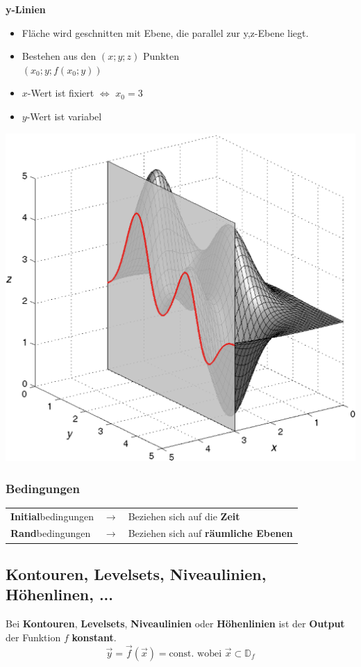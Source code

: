 \begin{minipage}[t]{0.48\columnwidth}
    \textbf{y-Linien}
    \begin{itemize}
        \item Fläche wird geschnitten mit Ebene, die parallel zur y,z-Ebene liegt.
        \item Bestehen aus den $(x;y;z)$ Punkten\\
        $(x_0;y;f(x_0;y))$
        \item $x$-Wert ist fixiert $\Leftrightarrow$ $x_0 = 3$
        \item $y$-Wert ist variabel
    \end{itemize}
    \includegraphics[width=\columnwidth]{images/schnitt_x0.png}
\end{minipage}

\subsubsection{Bedingungen}

\begin{tabular}{l l l}
    \textbf{Initial}bedingungen & $\rightarrow$ & Beziehen sich auf die \textbf{Zeit}\\
    \textbf{Rand}bedingungen & $\rightarrow$ & Beziehen sich auf \textbf{räumliche Ebenen}
\end{tabular}

\subsection{Kontouren, Levelsets, Niveaulinien, Höhenlinen, ...}
Bei \textbf{Kontouren}, \textbf{Levelsets}, \textbf{Niveaulinien} oder \textbf{Höhenlinien}
ist der \textbf{Output} der Funktion ${f}$ \textbf{konstant}.
$$\vec{y} = \vec{f}(\vec{x}) = \text{const. wobei } \vec{x} \subset \mathbb{D}_f$$

